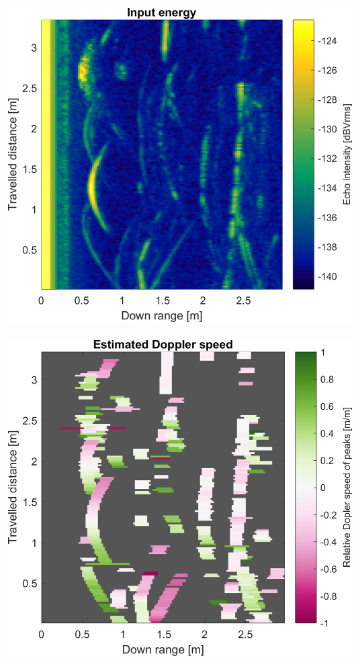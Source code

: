 \begin{figure}[htbp]
    \centering
    \begin{subfigure}[t]{0.475\linewidth}
        \centering
        \includegraphics[width=\linewidth,max height=.475\textheight]{gfx/results/basement_input.png}
    \end{subfigure}%
    \hfill%
    \begin{subfigure}[t]{0.475\linewidth}  
        \centering 
        \includegraphics[width=\linewidth,max height=.475\textheight]{gfx/results/basement_doppler.png}

\end{subfigure}
\end{figure}
